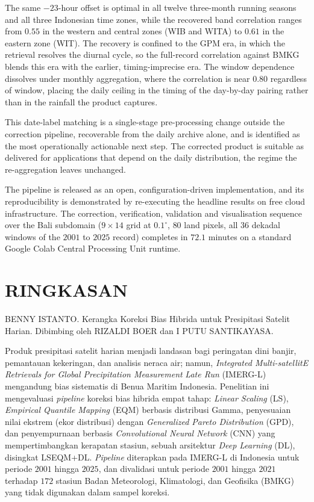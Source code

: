 The same
$-23$-hour offset is optimal in all twelve three-month running seasons
and all three Indonesian time zones, while the recovered band
correlation ranges from $0.55$ in the western and central zones (WIB and
WITA) to $0.61$ in the eastern zone (WIT). The recovery is confined to the GPM era, in
which the retrieval resolves the diurnal cycle, so the full-record
correlation against BMKG blends this era with the earlier, timing-imprecise era.
The window dependence dissolves under monthly aggregation, where the
correlation is near $0.80$ regardless of window, placing the daily
ceiling in the timing of the day-by-day pairing rather than in the
rainfall the product captures.

This date-label matching is a
single-stage pre-processing change outside the correction pipeline,
recoverable from the daily archive alone, and is identified as the most
operationally actionable next step. The corrected product is suitable as
delivered for applications that depend on the daily distribution, the
regime the re-aggregation leaves unchanged.

The pipeline is released as an open, configuration-driven
implementation, and its reproducibility is demonstrated by
re-executing the headline results on free cloud
infrastructure. The correction, verification, validation and
visualisation sequence over the Bali subdomain ($9 \times 14$ grid at
$0.1^{\circ}$, $80$ land pixels, all $36$ dekadal windows of the
$2001$ to $2025$ record) completes in $72.1$ minutes on a standard
Google Colab Central Processing Unit runtime.

\medskip
{}
\clearpage

\chapter*{RINGKASAN}\thispagestyle{empty}
\noindent BENNY ISTANTO. Kerangka Koreksi Bias Hibrida untuk
Presipitasi Satelit Harian. Dibimbing oleh RIZALDI BOER dan I PUTU
SANTIKAYASA.

\medskip
Produk presipitasi satelit harian menjadi landasan bagi peringatan dini banjir,
pemantauan kekeringan, dan analisis neraca air; namun, \emph{Integrated
Multi-satellitE Retrievals for Global Precipitation Measurement}
\emph{Late Run} (IMERG-L) mengandung bias sistematis di Benua Maritim
Indonesia. Penelitian ini mengevaluasi \emph{pipeline} koreksi bias
hibrida empat tahap: \emph{Linear Scaling} (LS), \emph{Empirical
Quantile Mapping} (EQM) berbasis distribusi Gamma, penyesuaian nilai ekstrem 
(ekor distribusi) dengan \emph{Generalized Pareto Distribution} (GPD), dan 
penyempurnaan berbasis \emph{Convolutional Neural Network} (CNN) yang
mempertimbangkan kerapatan stasiun, sebuah arsitektur \emph{Deep
Learning} (DL), disingkat LSEQM+DL. \emph{Pipeline} diterapkan pada
IMERG-L di Indonesia untuk periode $2001$ hingga $2025$, dan
divalidasi untuk periode $2001$ hingga $2021$ terhadap $172$ stasiun
Badan Meteorologi, Klimatologi, dan Geofisika (BMKG) yang tidak
digunakan dalam sampel koreksi.

